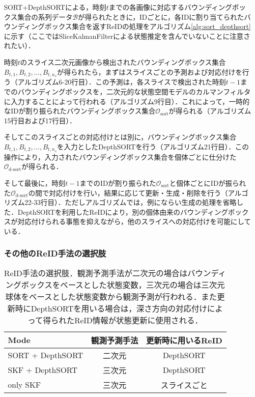         SORT+DepthSORTによる，時刻$t$までの各画像に対応するバウンディングボックス集合の系列データ$\mathcal{B}$が得られたときに，IDごとに，各IDに割り当てられたバウンディングボックス集合を返すReIDの処理をアルゴリズム\ref{alg:sort_depthsort}に示す（ここではSliceKalmanFilterによる状態推定を含んでいないことに注意されたい）．

        時刻$t$のスライス二次元画像から検出されたバウンディングボックス集合$B_{t, 1}, B_{t, 2}, \dots, B_{t, n_s}$が得られたら，まずはスライスごとの予測および対応付けを行う（アルゴリズム6-20行目）．この予測は，各スライスで検出された時刻$t-1$までのバウンディングボックスを，二次元的な状態空間モデルのカルマンフィルタに入力することによって行われる（アルゴリズム9行目）．これによって，一時的なIDが割り振られたバウンディングボックス集合$\mathcal{O}_{\text{sort}}$が得られる（アルゴリズム15行目および17行目）．

        そしてこのスライスごとの対応付けとは別に，バウンディングボックス集合$B_{t, 1}, B_{t, 2}, \dots, B_{t, n_s}$を入力としたDepthSORTを行う（アルゴリズム21行目）．この操作により，入力されたバウンディングボックス集合を個体ごとに仕分けた$\mathcal{O}_{\text{d-sort}}$が得られる．

        そして最後に，時刻$t-1$までのIDが割り振られた$\mathcal{O}_{\text{sort}}$と個体ごとにIDが振られた$\mathcal{O}_{\text{d-sort}}$の間で対応付けを行い，結果に応じて更新・生成・削除を行う（アルゴリズム22-33行目）．ただしアルゴリズムでは，例にならい生成の処理を省略した．DepthSORTを利用したReIDにより，別の個体由来のバウンディングボックスが対応付けられる事態を抑えながら，他のスライスへの対応付けを可能にしている．

        \subsubsection{その他のReID手法の選択肢}

        \begin{table}[t]
            \centering
            \caption[ReID手法の選択肢]{ReID手法の選択肢．観測予測手法が二次元の場合はバウンディングボックスをベースとした状態変数，三次元の場合は三次元球体をベースとした状態変数から観測予測が行われる．また更新時にDepthSORTを用いる場合は，深さ方向の対応付けによって得られたReID情報が状態更新に使用される．}
            \label{tab:reidentification_methods}
            \begin{tabular}{l|cc}
                Mode &  観測予測手法 & 更新時に用いるReID
                \\ \hline \hline
                SORT + DepthSORT & 二次元 & DepthSORT
                \\ SKF + DepthSORT & 三次元 & DepthSORT
                \\ only SKF & 三次元 & スライスごと 
            \end{tabular}
        \end{table}

